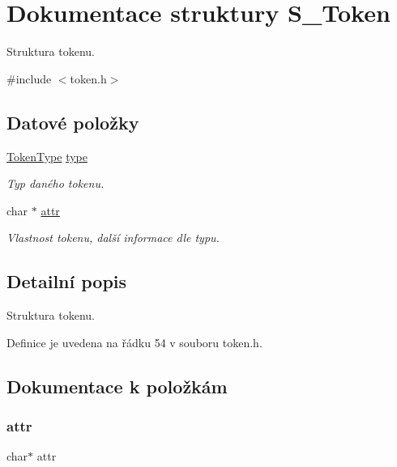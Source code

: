 \hypertarget{struct_s___token}{}\section{Dokumentace struktury S\+\_\+\+Token}
\label{struct_s___token}


Struktura tokenu.  




{\ttfamily \#include $<$token.\+h$>$}

\subsection*{Datové položky}
\begin{DoxyCompactItemize}
\item 
\hyperlink{token_8h_af940495a1407c2a014c0aed83c75ff20}{Token\+Type} \hyperlink{struct_s___token_a6e2d2148929ac137f2e2ef4091a4dc69}{type}
\begin{DoxyCompactList}\small\item\em Typ daného tokenu. \end{DoxyCompactList}\item 
char $\ast$ \hyperlink{struct_s___token_a128b80cc9c353ac261c3b7eee3139b68}{attr}
\begin{DoxyCompactList}\small\item\em Vlastnost tokenu, další informace dle typu. \end{DoxyCompactList}\end{DoxyCompactItemize}


\subsection{Detailní popis}
Struktura tokenu. 

Definice je uvedena na řádku 54 v souboru token.\+h.



\subsection{Dokumentace k položkám}
\mbox{\label{struct_s___token_a128b80cc9c353ac261c3b7eee3139b68}} 
\subsubsection{\texorpdfstring{attr}{attr}}
{\footnotesize\ttfamily char$\ast$ attr}



